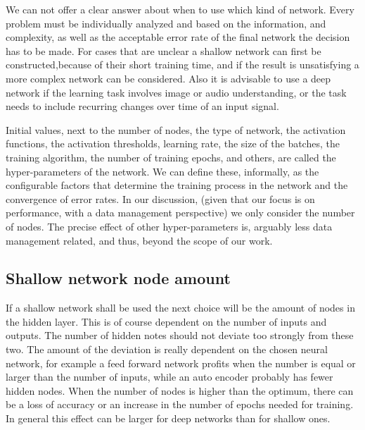 \documentclass[conference]{IEEEtran}
\begin{document}
We can not offer a clear answer about when to use which kind of network. Every problem must be individually analyzed and based on the information, and complexity, as well as the acceptable error rate of the final network the decision has to be made. For cases that are unclear a shallow network can first be constructed,because of their short training time, and if the result is unsatisfying a more complex network can be considered.  Also it is advisable to use a deep network if the learning task involves image or audio understanding, or the task needs to include recurring changes over time of an input signal\cite{PattersonGibson17}.


Initial values, next to the number of nodes, the type of network, the activation functions, the activation thresholds, learning rate, the size of the batches, the training algorithm, the number of training epochs, and others, are called the hyper-parameters of the network. We can define these, informally, as the configurable factors that determine the training process in the network and the convergence of error rates. In our discussion, (given that our focus is on performance, with a data management perspective) we only consider the number of nodes. The precise effect of other hyper-parameters is, arguably less data management related, and thus, beyond the scope of our work.


\subsection{Shallow network node amount}
If a shallow network shall be used the next choice will be the amount of nodes in the hidden layer. This is of course dependent on the number of inputs and outputs. The number of hidden notes should not deviate too strongly from these two. The amount of the deviation is really dependent on the chosen neural network, for example a feed forward network profits when the number is equal or larger than the number of inputs, while an auto encoder probably has fewer hidden nodes. When the number of nodes is higher than the optimum, there can be a loss of accuracy or an increase in the number of epochs needed for training. In general this effect can be larger for deep networks than for shallow ones.

\end{document}
